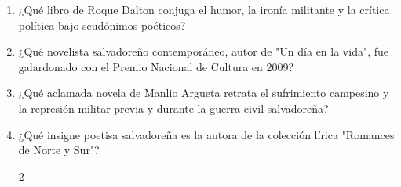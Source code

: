 \documentclass[10pt,a4paper]{article}
\begin{document}
\begin{enumerate}[label=\textbf{\arabic*.}]
\item ¿Qué libro de Roque Dalton conjuga el humor, la ironía militante y la crítica política bajo seudónimos poéticos?
\begin{enumerate}[label=\textbf{\Alph*)}]
\end{enumerate}
\vspace{0.15cm}
\item ¿Qué novelista salvadoreño contemporáneo, autor de "Un día en la vida", fue galardonado con el Premio Nacional de Cultura en 2009?
\begin{enumerate}[label=\textbf{\Alph*)}]
\end{enumerate}
\vspace{0.15cm}
\item ¿Qué aclamada novela de Manlio Argueta retrata el sufrimiento campesino y la represión militar previa y durante la guerra civil salvadoreña?
\begin{enumerate}[label=\textbf{\Alph*)}]
\end{enumerate}
\vspace{0.15cm}
\item ¿Qué insigne poetisa salvadoreña es la autora de la colección lírica "Romances de Norte y Sur"?
\begin{enumerate}[label=\textbf{\Alph*)}]
\begin{multicols}{2}

\end{multicols}
\end{enumerate}
\end{enumerate}
\end{document}
